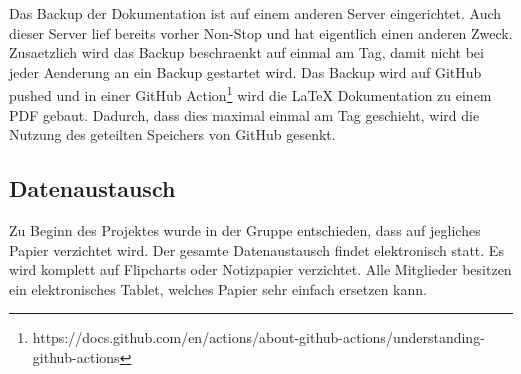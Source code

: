 Das Backup der Dokumentation ist auf einem anderen Server eingerichtet. Auch dieser Server lief bereits vorher Non-Stop und hat eigentlich einen anderen Zweck. Zusaetzlich wird das Backup beschraenkt auf einmal am Tag, damit nicht bei jeder Aenderung an ein Backup gestartet wird. Das Backup wird auf GitHub pushed und in einer GitHub Action\footnote{https://docs.github.com/en/actions/about-github-actions/understanding-github-actions} wird die LaTeX Dokumentation zu einem PDF gebaut. Dadurch, dass dies maximal einmal am Tag geschieht, wird die Nutzung des geteilten Speichers von GitHub gesenkt.

\subsection{Datenaustausch}

Zu Beginn des Projektes wurde in der Gruppe entschieden, dass auf jegliches Papier verzichtet wird. Der gesamte Datenaustausch findet elektronisch statt. Es wird komplett auf Flipcharts oder Notizpapier verzichtet. Alle Mitglieder besitzen ein elektronisches Tablet, welches Papier sehr einfach ersetzen kann.